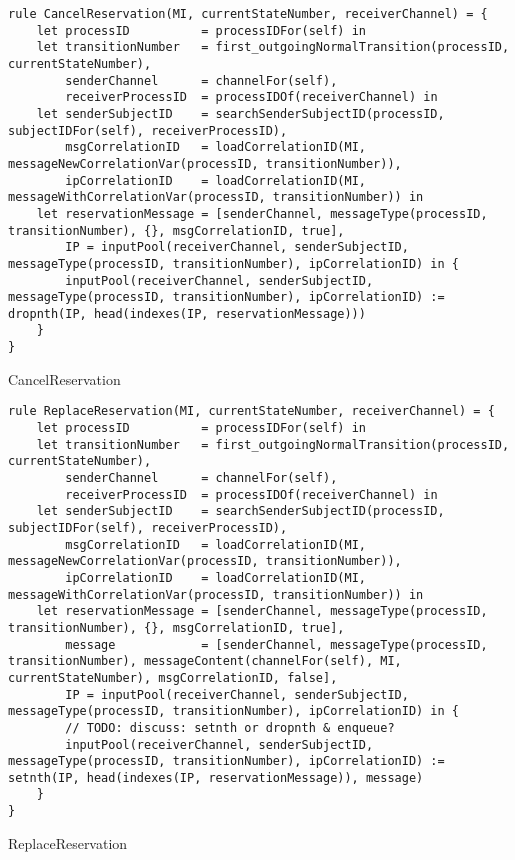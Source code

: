 \begin{listing}[H]
\begin{verbatim}
rule CancelReservation(MI, currentStateNumber, receiverChannel) = {
    let processID          = processIDFor(self) in
    let transitionNumber   = first_outgoingNormalTransition(processID, currentStateNumber),
        senderChannel      = channelFor(self),
        receiverProcessID  = processIDOf(receiverChannel) in
    let senderSubjectID    = searchSenderSubjectID(processID, subjectIDFor(self), receiverProcessID),
        msgCorrelationID   = loadCorrelationID(MI, messageNewCorrelationVar(processID, transitionNumber)),
        ipCorrelationID    = loadCorrelationID(MI, messageWithCorrelationVar(processID, transitionNumber)) in
    let reservationMessage = [senderChannel, messageType(processID, transitionNumber), {}, msgCorrelationID, true],
        IP = inputPool(receiverChannel, senderSubjectID, messageType(processID, transitionNumber), ipCorrelationID) in {
        inputPool(receiverChannel, senderSubjectID, messageType(processID, transitionNumber), ipCorrelationID) := dropnth(IP, head(indexes(IP, reservationMessage)))
    }
}
\end{verbatim}
\caption{CancelReservation}
\label{lst:asm:CancelReservation}
\end{listing}




\begin{listing}[H]
\begin{verbatim}
rule ReplaceReservation(MI, currentStateNumber, receiverChannel) = {
    let processID          = processIDFor(self) in
    let transitionNumber   = first_outgoingNormalTransition(processID, currentStateNumber),
        senderChannel      = channelFor(self),
        receiverProcessID  = processIDOf(receiverChannel) in
    let senderSubjectID    = searchSenderSubjectID(processID, subjectIDFor(self), receiverProcessID),
        msgCorrelationID   = loadCorrelationID(MI, messageNewCorrelationVar(processID, transitionNumber)),
        ipCorrelationID    = loadCorrelationID(MI, messageWithCorrelationVar(processID, transitionNumber)) in
    let reservationMessage = [senderChannel, messageType(processID, transitionNumber), {}, msgCorrelationID, true],
        message            = [senderChannel, messageType(processID, transitionNumber), messageContent(channelFor(self), MI, currentStateNumber), msgCorrelationID, false],
        IP = inputPool(receiverChannel, senderSubjectID, messageType(processID, transitionNumber), ipCorrelationID) in {
        // TODO: discuss: setnth or dropnth & enqueue?
        inputPool(receiverChannel, senderSubjectID, messageType(processID, transitionNumber), ipCorrelationID) := setnth(IP, head(indexes(IP, reservationMessage)), message)
    }
}
\end{verbatim}
\caption{ReplaceReservation}
\label{lst:asm:ReplaceReservation}
\end{listing}





